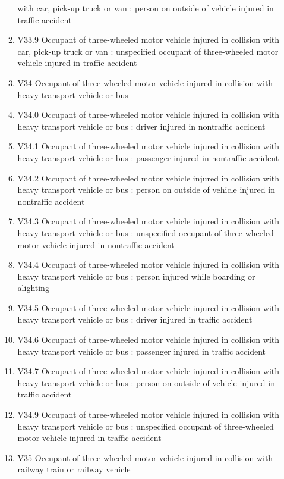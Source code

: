 \documentclass[
]{scrartcl}
\begin{document}
\begin{itemize}
\begin{enumerate}
    with car, pick-up truck or van : person on outside of vehicle
    injured in traffic accident
  \item
    V33.9 Occupant of three-wheeled motor vehicle injured in collision
    with car, pick-up truck or van : unspecified occupant of
    three-wheeled motor vehicle injured in traffic accident
  \item
    V34 Occupant of three-wheeled motor vehicle injured in collision
    with heavy transport vehicle or bus
  \item
    V34.0 Occupant of three-wheeled motor vehicle injured in collision
    with heavy transport vehicle or bus : driver injured in nontraffic
    accident
  \item
    V34.1 Occupant of three-wheeled motor vehicle injured in collision
    with heavy transport vehicle or bus : passenger injured in
    nontraffic accident
  \item
    V34.2 Occupant of three-wheeled motor vehicle injured in collision
    with heavy transport vehicle or bus : person on outside of vehicle
    injured in nontraffic accident
  \item
    V34.3 Occupant of three-wheeled motor vehicle injured in collision
    with heavy transport vehicle or bus : unspecified occupant of
    three-wheeled motor vehicle injured in nontraffic accident
  \item
    V34.4 Occupant of three-wheeled motor vehicle injured in collision
    with heavy transport vehicle or bus : person injured while boarding
    or alighting
  \item
    V34.5 Occupant of three-wheeled motor vehicle injured in collision
    with heavy transport vehicle or bus : driver injured in traffic
    accident
  \item
    V34.6 Occupant of three-wheeled motor vehicle injured in collision
    with heavy transport vehicle or bus : passenger injured in traffic
    accident
  \item
    V34.7 Occupant of three-wheeled motor vehicle injured in collision
    with heavy transport vehicle or bus : person on outside of vehicle
    injured in traffic accident
  \item
    V34.9 Occupant of three-wheeled motor vehicle injured in collision
    with heavy transport vehicle or bus : unspecified occupant of
    three-wheeled motor vehicle injured in traffic accident
  \item
    V35 Occupant of three-wheeled motor vehicle injured in collision
    with railway train or railway vehicle

\end{enumerate}
\end{itemize}
\end{document}

